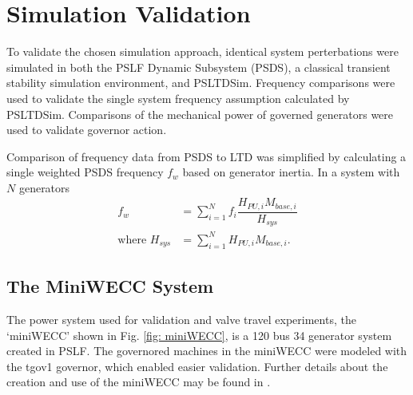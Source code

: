 \section{Simulation Validation}
To validate the chosen simulation approach, identical system perterbations were simulated in both the PSLF Dynamic Subsystem (PSDS), a classical transient stability simulation environment, and PSLTDSim.
Frequency comparisons were used to validate the single system frequency assumption calculated by PSLTDSim. Comparisons of the mechanical power of governed generators were used to validate governor action.

Comparison of frequency data from PSDS to LTD was simplified by calculating a single weighted PSDS frequency $f_w$ based on generator inertia. 
In a system with $N$ generators
\begin{align}
f_{w} &= \sum_{i=1}^{N} f_i \dfrac{H_{PU, i} M_{base, i} }{H_{sys}}  \label{eq: f_weighted}\\
\text{where } H_{sys} &= \sum_{i=1}^{N} H_{PU, i} M_{base, i}.  \label{eq: Hsys}
\end{align}


\subsection{The MiniWECC System}

The power system used for validation and valve travel experiments, the `miniWECC' shown in Fig. \ref{fig: miniWECC}, is a 120 bus 34 generator system created in PSLF.
The governored machines in the miniWECC were modeled with the tgov1 governor, which enabled easier validation.
Further details about the creation and use of the miniWECC may be found in \cite{trudnowski2012, sandia2015, RJminiWECC}.

